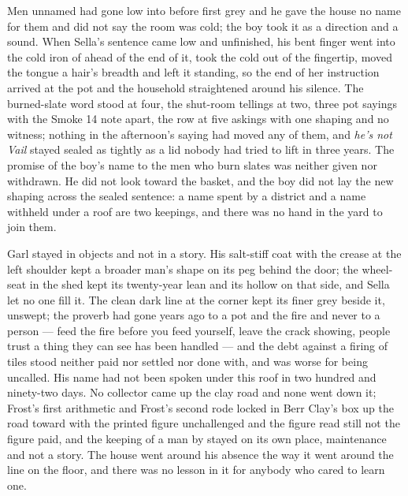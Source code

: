 Men unnamed had gone low into  before first grey and he gave the house no name for them and did not say the room was cold; the boy took it as a direction and a sound. When Sella's sentence came low and unfinished, his bent finger went into the cold iron of  ahead of the end of it, took the cold out of the fingertip, moved the tongue a hair's breadth and left it standing, so the end of her instruction arrived at the pot and the household straightened around his silence. The burned-slate word stood at four, the shut-room tellings at two, three pot sayings with the Smoke 14 note apart, the row at five askings with one shaping and no witness; nothing in the afternoon's saying had moved any of them, and \emph{he's not Vail} stayed sealed as tightly as a lid nobody had tried to lift in three years. The promise of the boy's name to the men who burn slates was neither given nor withdrawn. He did not look toward the basket, and the boy did not lay the new shaping across the sealed sentence: a name spent by a district and a name withheld under a roof are two keepings, and there was no hand in the yard to join them.

Garl stayed in objects and not in a story. His salt-stiff coat with the crease at the left shoulder kept a broader man's shape on its peg behind the door; the wheel-seat in the shed kept its twenty-year lean and its hollow on that side, and Sella let no one fill it. The clean dark line at the corner kept its finer grey beside it, unswept; the proverb had gone years ago to a pot and the fire and never to a person --- feed the fire before you feed yourself, leave the crack showing, people trust a thing they can see has been handled --- and the debt against a firing of tiles stood neither paid nor settled nor done with, and was worse for being uncalled. His name had not been spoken under this roof in two hundred and ninety-two days. No collector came up the clay road and none went down it; Frost's first arithmetic and Frost's second rode locked in Berr Clay's box up the road toward  with the printed figure unchallenged and the figure read still not the figure paid, and the keeping of a man by  stayed on its own place, maintenance and not a story. The house went around his absence the way it went around the line on the floor, and there was no lesson in it for anybody who cared to learn one.

\scenebreak

